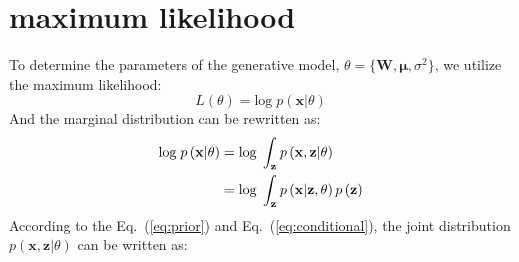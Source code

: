 \documentclass{article}
\begin{document}
	\section{maximum likelihood}
	To determine the parameters of the generative model, $ \theta = \{ \mathbf W, \boldsymbol \mu, \sigma^2 \}$, we utilize the maximum likelihood:
	\begin{equation}
		L\left(\theta\right) = \mbox{log}\; p\left(\mathbf x| \theta \right)
	\end{equation}
	And the marginal distribution can be rewritten as:
	\begin{align}
       \mbox{log}\; p\left(\mathbf x| \theta \right) &= \mbox{log}\; \int_{\mathbf z}^{} p\left(\mathbf x, \mathbf z| \theta \right)\notag\\
       & = \mbox{log}\; \int_{\mathbf z}^{} p\left(\mathbf x|\mathbf z, \theta \right)p\left(\mathbf z \right)\label{eq:marginal}
	\end{align}
	According to the Eq.~(\ref{eq:prior}) and Eq.~(\ref{eq:conditional}), the joint distribution $p\left(\mathbf x, \mathbf z| \theta \right)$ can be written as:
\end{document}
